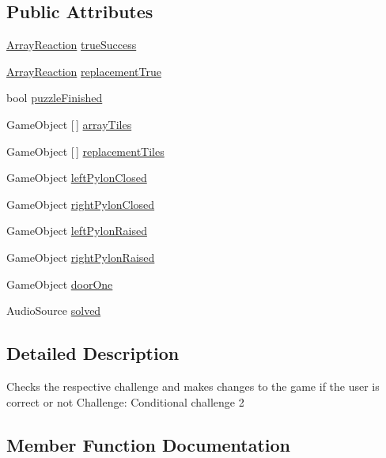 \subsection*{Public Attributes}
\begin{DoxyCompactItemize}
\item 
\hyperlink{class_array_reaction}{Array\+Reaction} \hyperlink{class_logical_or_completion_ae5240c050cf760aca98a3466dfa3bd6a}{true\+Success}
\item 
\hyperlink{class_array_reaction}{Array\+Reaction} \hyperlink{class_logical_or_completion_aabb4ebdcb4e38046c43f6379d7c0b688}{replacement\+True}
\item 
bool \hyperlink{class_logical_or_completion_ad518cbefee91205d37240ba2dd7fdd19}{puzzle\+Finished}
\item 
Game\+Object \mbox{[}$\,$\mbox{]} \hyperlink{class_logical_or_completion_a5a9d2e3e6a922a095361ab66a2e1342e}{array\+Tiles}
\item 
Game\+Object \mbox{[}$\,$\mbox{]} \hyperlink{class_logical_or_completion_a4a8bfa05984877d32f5575d0bab00e1d}{replacement\+Tiles}
\item 
Game\+Object \hyperlink{class_logical_or_completion_a5618b9b7c564da318010746ba2a081d4}{left\+Pylon\+Closed}
\item 
Game\+Object \hyperlink{class_logical_or_completion_af7cfc7e6435c297479a2bcb47481ae59}{right\+Pylon\+Closed}
\item 
Game\+Object \hyperlink{class_logical_or_completion_adeb8fe88dd74a1b439ada910c58d0ae3}{left\+Pylon\+Raised}
\item 
Game\+Object \hyperlink{class_logical_or_completion_ae7398a003db47542eed166c249a78ee2}{right\+Pylon\+Raised}
\item 
Game\+Object \hyperlink{class_logical_or_completion_a0143c2b8f5eca58b7a3606c281381c9b}{door\+One}
\item 
Audio\+Source \hyperlink{class_logical_or_completion_a5c9e98e9b0cdfe29a2ed689a6d2da120}{solved}
\end{DoxyCompactItemize}


\subsection{Detailed Description}
Checks the respective challenge and makes changes to the game if the user is correct or not Challenge\+: Conditional challenge 2 

\subsection{Member Function Documentation}
\mbox{\label{class_logical_or_completion_af8cbd9a832c9c69ee46fb70020a7989b}} 
